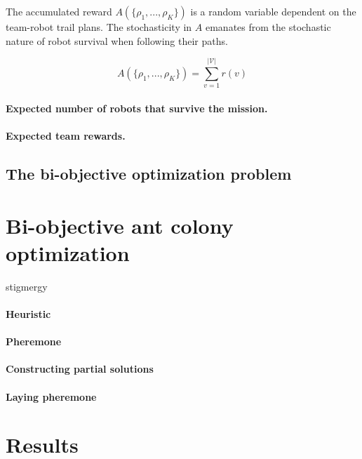 \documentclass[11pt, oneside]{article}
\begin{document}
The accumulated reward $A(\{\rho_1, ..., \rho_K\})$ is a random variable dependent on the team-robot trail plans.
The stochasticity in $A$ emanates from the stochastic nature of robot survival when following their paths. 

\begin{equation}
	A(\{\rho_1, ..., \rho_K\}) = \sum_{v=1}^{ \lvert \mathcal{V} \rvert} r(v)%
\end{equation}




\paragraph{Expected number of robots that survive the mission.}

\paragraph{Expected team rewards.}

\subsection{The bi-objective optimization problem}

\section{Bi-objective ant colony optimization}
stigmergy

\paragraph{Heuristic}

\paragraph{Pheremone}

\paragraph{Constructing partial solutions}

\paragraph{Laying pheremone}

\section{Results}
\end{document}
